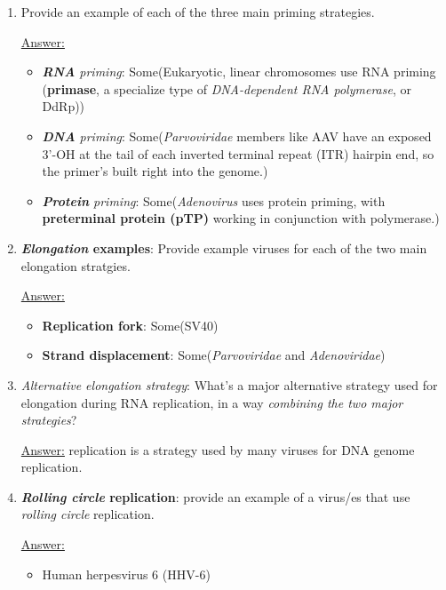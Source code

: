 \documentclass{article}
\newenvironment{QandA}{\begin{enumerate}[label=\bfseries Q\arabic*.]}
                       {\end{enumerate}}
\newenvironment{answered}{\par\normalfont\underline{Answer:}}{}
\begin{document}
\begin{QandA}
\begin{answered}
\begin{itemize}
    \end{itemize}
    \end{answered}
  \item{Provide an example of each of the three main priming strategies.}
    \begin{answered}
    \begin{itemize}
      \item{\textit{\textbf{RNA} priming}: Some(Eukaryotic, linear chromosomes use RNA priming (\textbf{primase}, a specialize type of \textit{DNA-dependent RNA polymerase}, or DdRp))}
      \item{\textit{\textbf{DNA} priming}: Some(\textit{Parvoviridae} members like AAV have an exposed 3'-OH at the tail of each inverted terminal repeat (ITR) hairpin end, so the primer's built right into the genome.)}
      \item{\textit{\textbf{Protein} priming}: Some(\textit{Adenovirus} uses protein priming, with \textbf{preterminal protein (pTP)} working in conjunction with polymerase.)}
    \end{itemize}
    \end{answered}
  \item{\textbf{\textit{Elongation} examples}: Provide example viruses for each of the two main elongation stratgies.}
    \begin{answered}
    \begin{itemize}
      \item{\textbf{Replication fork}: Some(SV40)}
      \item{\textbf{Strand displacement}: Some(\textit{Parvoviridae} and \textit{Adenoviridae})}
    \end{itemize}
    \end{answered}
  \item{\textit{Alternative \textit{elongation} strategy}: What's a major alternative strategy used for elongation during RNA replication, in a way \textit{combining the two major strategies}?}
    \begin{answered}
     replication is a strategy used by many viruses for DNA genome replication.
    \end{answered}
  \item{\textbf{\textit{Rolling circle} replication}: provide an example of a virus/es that use \textit{rolling circle} replication.}
    \begin{answered}
    \begin{itemize}
      \item{Human herpesvirus 6 (HHV-6)}

\end{itemize}
\end{answered}
\end{QandA}
\end{document}
